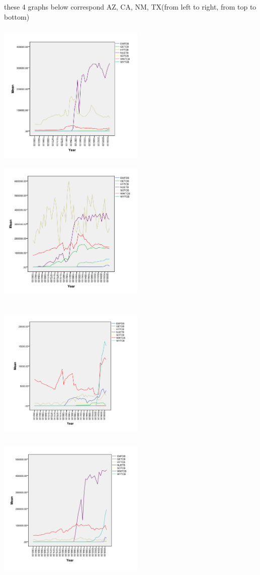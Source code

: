\documentclass[12pt]{article}
\begin{document}
these 4 graphs below correspond AZ, CA, NM, TX(from left to right, from top to bottom)

\includegraphics[width=7cm,height=7cm]{b5.png}
\includegraphics[width=7cm,height=7cm]{b61.png}

\includegraphics[width=7cm,height=7cm]{b7.png}
\includegraphics[width=7cm,height=7cm]{b81.png}
\end{document}
